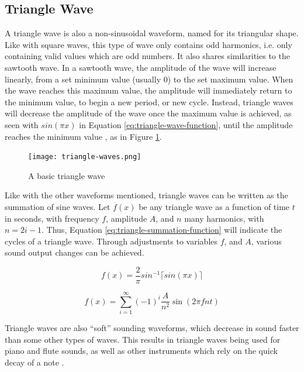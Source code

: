 \subsection{Triangle Wave}\label{subsection:triangle-wave}

A triangle wave is also a non-sinusoidal waveform, named for its triangular shape. Like with square waves, this type of wave only contains odd harmonics, i.e. only containing valid values which are odd numbers. It also shares similarities to the sawtooth wave. In a sawtooth wave, the amplitude of the wave will increase linearly, from a set minimum value (usually 0) to the set maximum value. When the wave reaches this maximum value, the amplitude will immediately return to the minimum value, to begin a new period, or new cycle. Instead, triangle waves will decrease the amplitude of the wave once the maximum value is achieved, as seen with $sin(\pi x)$ in Equation \ref{eq:triangle-wave-function}, until the amplitude reaches the minimum value \cite{Tarr_2019}, as in Figure \ref{fig:triangle-wave}.

\begin{figure}[ht]
  \centering
  \texttt{[image: triangle-waves.png]}
  \caption{A basic triangle wave}\cite{Wellesley_College_Staff_2021}
  \label{fig:triangle-wave}
\end{figure}


Like with the other waveforms mentioned, triangle waves can be written as the summation of sine waves. Let $f(x)$ be any triangle wave as a function of time $t$ in seconds, with frequency $f$, amplitude $A$, and $n$ many harmonics, with $n = 2i - 1$. Thus, Equation \ref{eq:triangle-summation-function} will indicate the cycles of a triangle wave. Through adjustments to variables $f$, and $A$, various sound output changes can be achieved. 

\begin{equation}
	f(x) = \frac{2}{\pi}sin^{-1}\lceil sin(\pi x) \rceil
	\label{eq:triangle-wave-function}	
\end{equation}

\begin{equation}
	f(x) = \sum_{i=1}^{\infty} (-1)^i \frac{A}{n^2} \sin(2\pi fnt)
	\label{eq:triangle-summation-function}
\end{equation}

Triangle waves are also ``soft'' sounding waveforms, which decrease in sound faster than some other types of waves. This results in triangle waves being used for piano and flute sounds, as well as other instruments which rely on the quick decay of a note \cite{Dowsett_2016}.

